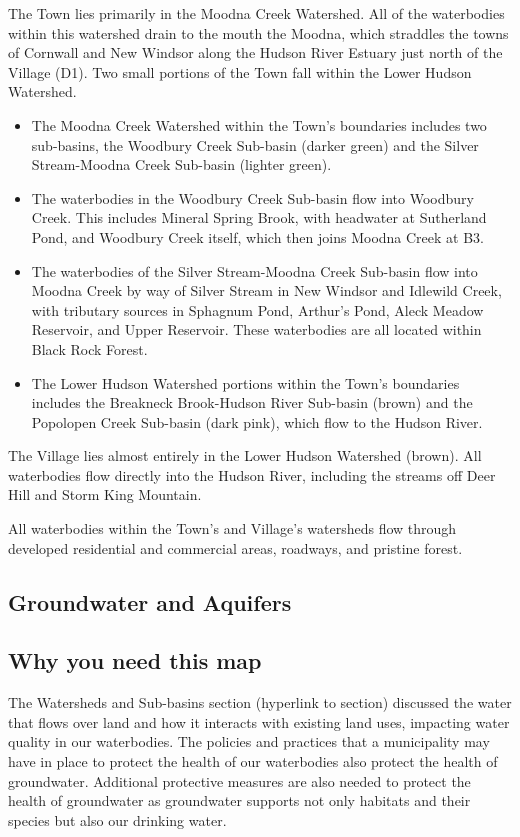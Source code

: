 The Town lies primarily in the Moodna Creek Watershed. All of the waterbodies 
within this watershed drain to the mouth the Moodna, which straddles the towns 
of Cornwall and New Windsor along the Hudson River Estuary just north of the 
Village (D1). Two small portions of the Town fall within the Lower Hudson 
Watershed.
\begin{itemize}
  \item The Moodna Creek Watershed within the Town's boundaries includes two 
    sub-basins, the Woodbury Creek Sub-basin (darker green) and the 
    Silver Stream-Moodna Creek Sub-basin (lighter green).
  \item The waterbodies in the Woodbury Creek Sub-basin flow into Woodbury 
    Creek. This includes Mineral Spring Brook, with headwater at Sutherland 
    Pond, and Woodbury Creek itself, which then joins Moodna Creek at B3.
  \item The waterbodies of the Silver Stream-Moodna Creek Sub-basin flow 
    into Moodna Creek by way of Silver Stream in New Windsor and Idlewild 
    Creek, with tributary sources in Sphagnum Pond, Arthur’s Pond, Aleck Meadow 
    Reservoir, and Upper Reservoir. These waterbodies are all located within 
    Black Rock Forest.
  \item The Lower Hudson Watershed portions within the Town's boundaries 
    includes the Breakneck Brook-Hudson River Sub-basin (brown) and the 
    Popolopen Creek Sub-basin (dark pink), which flow to the Hudson River.
\end{itemize}
The Village lies almost entirely in the Lower Hudson Watershed (brown). All 
waterbodies flow directly into the Hudson River, including the streams off Deer 
Hill and Storm King Mountain.

All waterbodies within the Town’s and Village’s watersheds flow through 
developed residential and commercial areas, roadways, and pristine forest.

\label{map:watershedsandsubbasins}

\subsection{Groundwater and Aquifers}\label{subsec:groundwater}
\subsection*{Why you need this map}
The Watersheds and Sub-basins section (hyperlink to section) discussed the 
water that flows over land and how it interacts with existing land uses, 
impacting water quality in our waterbodies. The policies and practices that a 
municipality may have in place to protect the health of our waterbodies also 
protect the health of groundwater. Additional protective measures are also 
needed to protect the health of groundwater as groundwater supports not only 
habitats and their species but also our drinking water.
